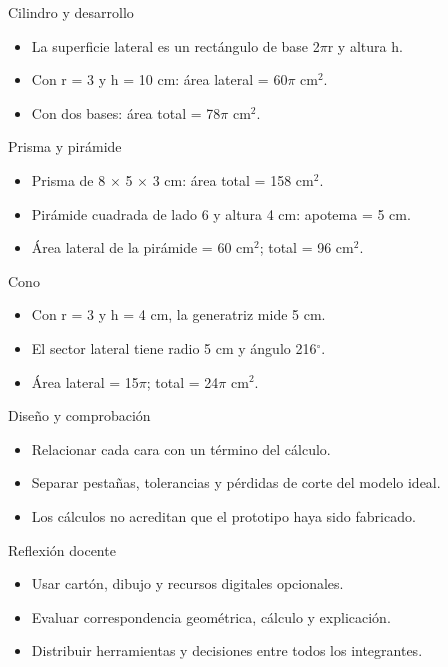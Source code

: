 \documentclass[
	spanish,
	aspectratio=1610,
	xcolor={dvipsnames,table}
]{beamer}
\begin{document}
\begin{frame}{Cilindro y desarrollo}
\fontsize{14}{18}\selectfont\begin{itemize}\setlength{\itemsep}{.45cm}
\item La superficie lateral es un rectángulo de base 2$\pi$r y altura h.
\item Con r = 3 y h = 10 cm: área lateral = 60$\pi$ cm$^2$.
\item Con dos bases: área total = 78$\pi$ cm$^2$.
\end{itemize}
\end{frame}
\begin{frame}{Prisma y pirámide}
\fontsize{14}{18}\selectfont\begin{itemize}\setlength{\itemsep}{.45cm}
\item Prisma de 8 $\times$ 5 $\times$ 3 cm: área total = 158 cm$^2$.
\item Pirámide cuadrada de lado 6 y altura 4 cm: apotema = 5 cm.
\item Área lateral de la pirámide = 60 cm$^2$; total = 96 cm$^2$.
\end{itemize}
\end{frame}
\begin{frame}{Cono}
\fontsize{14}{18}\selectfont\begin{itemize}\setlength{\itemsep}{.45cm}
\item Con r = 3 y h = 4 cm, la generatriz mide 5 cm.
\item El sector lateral tiene radio 5 cm y ángulo 216$^\circ$.
\item Área lateral = 15$\pi$; total = 24$\pi$ cm$^2$.
\end{itemize}
\end{frame}
\begin{frame}{Diseño y comprobación}
\fontsize{14}{18}\selectfont\begin{itemize}\setlength{\itemsep}{.45cm}
\item Relacionar cada cara con un término del cálculo.
\item Separar pestañas, tolerancias y pérdidas de corte del modelo ideal.
\item Los cálculos no acreditan que el prototipo haya sido fabricado.
\end{itemize}
\end{frame}
\begin{frame}{Reflexión docente}
\fontsize{14}{18}\selectfont\begin{itemize}\setlength{\itemsep}{.45cm}
\item Usar cartón, dibujo y recursos digitales opcionales.
\item Evaluar correspondencia geométrica, cálculo y explicación.
\item Distribuir herramientas y decisiones entre todos los integrantes.
\end{itemize}
\end{frame}
\end{document}
